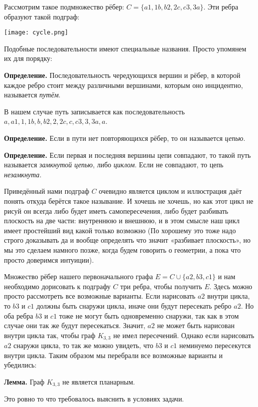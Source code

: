 Рассмотрим такое подмножество рёбер: $C = \{a1, 1b, b2, 2c, c3, 3a\}$. Эти ребра образуют такой подграф:

\texttt{[image: cycle.png]}

Подобные последовательности имеют специальные названия. Просто упомянем их для порядку:

{\bfseries Определение.} Последовательность чередующихся вершин и рёбер, в которой каждое ребро стоит между различными вершинами, которым оно инцидентно, называется {\slshape путём}.

В нашем случае путь записывается как последовательность $a, a1, 1, 1b, b, b2, 2, 2c, c, c3, 3, 3a, a$.

{\bfseries Определение.} Если в пути нет повторяющихся рёбер, то он называется {\slshape цепью}.

{\bfseries Определение.} Если первая и последняя вершины цепи совпадают, то такой путь называется {\slshape замкнутой цепью}, либо {\slshape циклом}. Если не совпадают, то цепь {\slshape незамкнута}.

Приведённый нами подграф $C$ очевидно является циклом и иллюстрация даёт понять откуда берётся такое называние. И хочешь не хочешь, но как этот цикл не рисуй он всегда либо будет иметь самопересечения, либо будет разбивать плоскость на две части: внутреннюю и внешнюю, и в этом смысле наш цикл имеет простейший вид какой только возможно (По хорошему это тоже надо строго доказывать да и вообще определять что значит «разбивает плоскость», но мы это сделаем намного позже, когда будем говорить о геометрии, а пока что просто доверимся интуиции).

Множество рёбер нашего первоначального графа $E = C \cup \{a2, b3, c1\}$ и нам необходимо дорисовать к подграфу $C$ три ребра, чтобы получить $E$. Здесь можно просто рассмотреть все возможные варианты. Если нарисовать $a2$ внутри цикла, то $b3$ и $c 1$ должны быть снаружи цикла, иначе они будут пересекать ребро $a2$. Но оба ребра $b3$ и $c 1$ тоже не могут быть одновременно снаружи, так как в этом случае они так же будут пересекаться. Значит, $a2$ не может быть нарисован внутри цикла так, чтобы граф $K_{3, 3}$ не имел пересечений. Однако если нарисовать $a2$ снаружи цикла, то так же можно увидеть, что $b3$ и $c 1$ неминуемо пересекутся внутри цикла. Таким образом мы перебрали все возможные варианты и убедились:

{\bfseries Лемма.} Граф $K_{3, 3}$ не является планарным.

Это ровно то что требовалось выяснить в условиях задачи.

